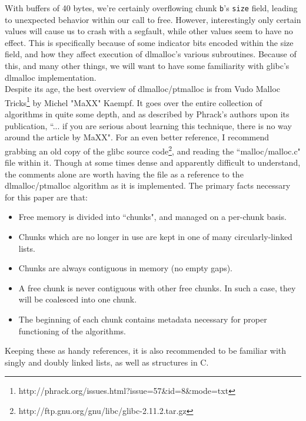 With buffers of 40 bytes, we're certainly overflowing chunk \texttt{b}'s
\texttt{size} field, leading to unexpected behavior within our call to free.
However, interestingly only certain values will cause us to crash with a segfault,
while other values seem to have no effect. This is specifically because of 
some indicator bits encoded within the size field, and how they affect execution
of dlmalloc's various subroutines. Because of this, and many other things, we will
want to have some familiarity with glibc's dlmalloc implementation.\\

Despite its age, the best overview of dlmalloc/ptmalloc is from Vudo Malloc Tricks\footnote{http://phrack.org/issues.html?issue=57\&id=8\&mode=txt}
by  Michel "MaXX" Kaempf. It goes over the entire collection of
algorithms in quite some depth, and as described by Phrack's authors 
upon its publication, ``... if you are serious about learning this
technique, there is no way around the article by MaXX". For an even
better reference, I recommend grabbing an old copy of the glibc source
code\footnote{http://ftp.gnu.org/gnu/libc/glibc-2.11.2.tar.gz}, and reading the ``malloc/malloc.c" file within it. Though
at some times dense and apparently difficult to understand, the comments
alone are worth having the file as a reference to the dlmalloc/ptmalloc
algorithm as it is implemented. The primary facts necessary for this paper
are that:
\begin{itemize}
\item Free memory is divided into ``chunks", and managed on a per-chunk basis.
\item Chunks which are no longer in use are kept in one of many circularly-linked lists.
\item Chunks are always contiguous in memory (no empty gaps).
\item A free chunk is never contiguous with other free chunks. In such a case, they will be coalesced into one chunk.
\item The beginning of each chunk contains metadata necessary for proper functioning of the algorithms.
\end{itemize}
Keeping these as handy references, it is
also recommended to be familiar with singly and doubly linked lists,
as well as structures in C.\\



